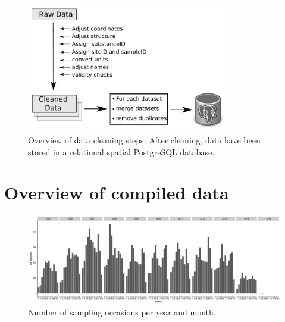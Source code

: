 \documentclass[pdftex,
	a4paper,
	titlepage=false]{scrreprt}
\begin{document}
\begin{figure}[ht]
	\centering
	\includegraphics[width = 0.8\textwidth]{data_cleaning}
	\caption[Overview of data cleaning steps.]{Overview of data cleaning steps. After cleaning, data have been stored in a relational spatial PostgreSQL database.}
	\label{fig:data_cleaning}
\end{figure}



\chapter{Overview of compiled data}


\begin{figure}[ht]
	\centering
	\includegraphics[width = \textwidth]{temporal}
	\caption{Number of sampling occasions per year and month.}
	\label{fig:temporal}
\end{figure}
\end{document}
